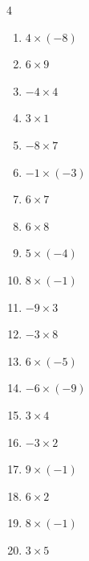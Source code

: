 \begin{multicols}{4}
\begin{enumerate}
  \item $4\times (-8)$
        \phantom{$=-32$}

  \item $6\times 9$
        \phantom{$=54$}

  \item $-4\times 4$
        \phantom{$=-16$}

  \item $3\times 1$
        \phantom{$=3$}

  \item $-8\times 7$
        \phantom{$=-56$}

  \item $-1\times (-3)$
        \phantom{$=3$}

\columnbreak %

\resetques

  \item $6\times 7$
        \phantom{$=42$}

  \item $6\times 8$
        \phantom{$=48$}

  \item $5\times (-4)$
        \phantom{$=-20$}

  \item $8\times (-1)$
        \phantom{$=-8$}

  \item $-9\times 3$
        \phantom{$=-27$}

  \item $-3\times 8$
        \phantom{$=-24$}

  \item $6\times (-5)$
        \phantom{$=-30$}

  \item $-6\times (-9)$
        \phantom{$=54$}

  \item $3\times 4$
        \phantom{$=12$}

  \item $-3\times 2$
        \phantom{$=-6$}

  \item $9\times (-1)$
        \phantom{$=-9$}

  \item $6\times 2$
        \phantom{$=12$}

  \item $8\times (-1)$
        \phantom{$=-8$}

  \item $3\times 5$
        \phantom{$=15$}


\end{enumerate}
\end{multicols}
